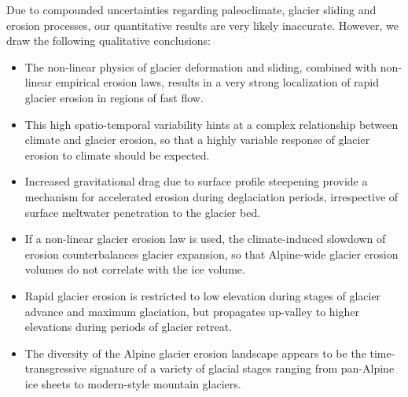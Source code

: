 \documentclass[esurf, manuscript]{copernicus}
\begin{document}
\conclusions

    Due to compounded uncertainties regarding paleoclimate, glacier sliding and
    erosion processes, our quantitative results are very likely inaccurate.
    However, we draw the following qualitative conclusions:
    \begin{itemize}
      \item The non-linear physics of glacier deformation and sliding, combined
        with non-linear empirical erosion laws, results in a very strong
        localization of rapid glacier erosion in regions of fast flow.
      \item This high spatio-temporal variability hints at a complex
        relationship between climate and glacier erosion, so that a highly
        variable response of glacier erosion to climate should be expected.
      \item Increased gravitational drag due to surface profile steepening
        provide a mechanism
        for accelerated erosion during deglaciation periods, irrespective of
        surface meltwater penetration to the glacier bed.
      \item If a non-linear glacier erosion law is used, the climate-induced
        slowdown of erosion counterbalances glacier expansion, so that
        Alpine-wide glacier erosion volumes do not correlate with the ice volume.
      \item Rapid glacier erosion is restricted to low elevation during stages
        of glacier advance and maximum glaciation, but propagates up-valley to
        higher elevations during periods of glacier retreat.
      \item The diversity of the Alpine glacier erosion landscape appears to
        be the time-transgressive signature of a variety of glacial stages
        ranging from pan-Alpine ice sheets to modern-style mountain glaciers.
    \end{itemize}



\end{document}
